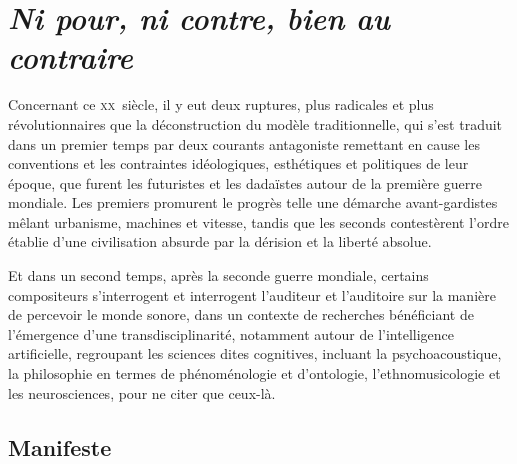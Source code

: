 \documentclass{article}
\begin{document}
%
%

\section{\textit{Ni pour, ni contre, bien au contraire}}

Concernant ce \textsc{xx}\ieme ~siècle, il y eut deux ruptures, plus radicales et plus révolutionnaires que la déconstruction du modèle traditionnelle, %
qui s'est traduit dans un premier temps par deux courants antagoniste remettant en cause les conventions et les contraintes idéologiques, esthétiques et politiques de leur époque, que furent les futuristes %
et les dadaïstes autour de la première guerre mondiale. Les premiers promurent le progrès telle une démarche avant-gardistes mêlant urbanisme, machines et vitesse, tandis que les seconds contestèrent l'ordre établie d'une civilisation absurde par la dérision et la liberté absolue. 

Et dans un second temps, après la seconde guerre mondiale, certains compositeurs s'interrogent et interrogent l'auditeur et l'auditoire sur la manière de percevoir le monde sonore, dans un contexte de recherches bénéficiant de l'émergence d'une transdisciplinarité, notamment autour de l'intelligence artificielle, regroupant les sciences dites cognitives, incluant la psychoacoustique, la philosophie en termes de phénoménologie et d'ontologie, l'ethnomusicologie et les neurosciences, pour ne citer que ceux-là.

\subsection{Manifeste}
\end{document}
